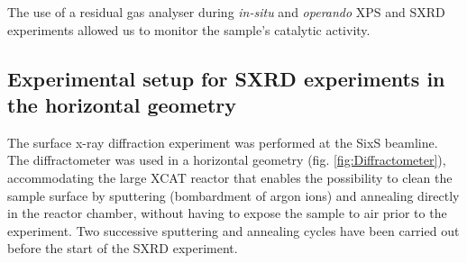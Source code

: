 \begin{table}[!htb]
\centering
{}
\caption{
    Different atmospheres used to probe the ammonia oxidation on Pt(100) and Pt(111) single crystals with NAP-XPS.
    The duration of each condition was approximately \qty{5}{\hour}.
}
\label{tab:ConditionsXPS}
\end{table}

The use of a residual gas analyser during \textit{in-situ} and \textit{operando} XPS and SXRD experiments allowed us to monitor the sample's catalytic activity.

\subsection{Experimental setup for SXRD experiments in the horizontal geometry}\label{sec:SXRDSetupH}

The surface x-ray diffraction experiment was performed at the SixS beamline.
The diffractometer was used in a horizontal geometry (fig. \ref{fig:Diffractometer}), accommodating the large XCAT reactor that enables the possibility to clean the sample surface by sputtering (bombardment of argon ions) and annealing directly in the reactor chamber, without having to expose the sample to air prior to the experiment.
Two successive sputtering and annealing cycles have been carried out before the start of the SXRD experiment.

